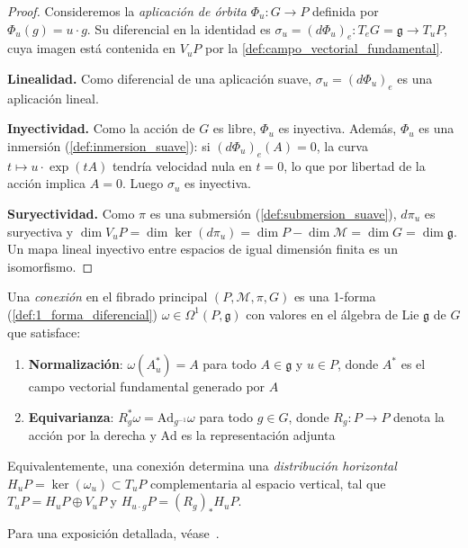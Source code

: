 \begin{proof}
Consideremos la \textit{aplicación de órbita} $\Phi_u: G \to P$ definida por $\Phi_u(g) = u \cdot g$. Su diferencial en la identidad es $\sigma_u = (d\Phi_u)_e: T_eG = \mathfrak{g} \to T_uP$, cuya imagen está contenida en $V_uP$ por la \autoref{def:campo_vectorial_fundamental}.

\textbf{Linealidad.} Como diferencial de una aplicación suave, $\sigma_u = (d\Phi_u)_e$ es una aplicación lineal.

\textbf{Inyectividad.} Como la acción de $G$ es libre, $\Phi_u$ es inyectiva. Además, $\Phi_u$ es una inmersión (\autoref{def:inmersion_suave}): si $(d\Phi_u)_e(A) = 0$, la curva $t \mapsto u \cdot \exp(tA)$ tendría velocidad nula en $t = 0$, lo que por libertad de la acción implica $A = 0$. Luego $\sigma_u$ es inyectiva.

\textbf{Suryectividad.} Como $\pi$ es una submersión (\autoref{def:submersion_suave}), $d\pi_u$ es suryectiva y $\dim V_u P = \dim \ker(d\pi_u) = \dim P - \dim \mathcal{M} = \dim G = \dim \mathfrak{g}$. Un mapa lineal inyectivo entre espacios de igual dimensión finita es un isomorfismo.
\end{proof}

\begin{definition}\label{def:conexion_fibrado}
Una \textit{conexión} en el fibrado principal $(P, \mathcal{M}, \pi, G)$ es una 1-forma (\autoref{def:1_forma_diferencial}) $\omega \in \Omega^1(P, \mathfrak{g})$ con valores en el álgebra de Lie $\mathfrak{g}$ de $G$ que satisface:
\begin{enumerate}
    \item \textbf{Normalización}: $\omega(A^*_u) = A$ para todo $A \in \mathfrak{g}$ y $u \in P$, donde $A^*$ es el campo vectorial fundamental generado por $A$
    \item \textbf{Equivarianza}: $R_g^* \omega = \mathrm{Ad}_{g^{-1}} \omega$ para todo $g \in G$, donde $R_g: P \to P$ denota la acción por la derecha y $\mathrm{Ad}$ es la representación adjunta
\end{enumerate}
Equivalentemente, una conexión determina una \textit{distribución horizontal} $H_u P = \ker(\omega_u) \subset T_u P$ complementaria al espacio vertical, tal que $T_u P = H_u P \oplus V_u P$ y $H_{u \cdot g} P = (R_g)_* H_u P$.

Para una exposición detallada, véase~\citep{Taubes2011}.
\end{definition}

